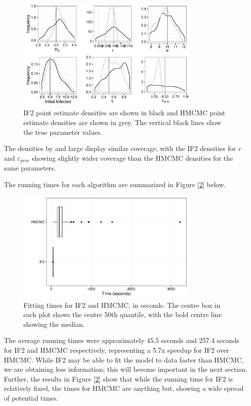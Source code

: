     \begin{figure}
        \centering
        \captionsetup{width=.8\linewidth}
        \includegraphics[width=0.8\textwidth]{./images/combined-multi.pdf}
        \caption{IF2 point estimate densities are shown in black and HMCMC point estimate densities are shown in grey. The vertical black lines show the true parameter values. \label{combinedmulti}}
    \end{figure}

    The densities by and large display similar coverage, with the IF2 densities for $r$ and $\varepsilon_{proc}$ showing slightly wider coverage than the HMCMC densities for the same parameters.

    The running times for each algorithm are summarized in Figure [\ref{timeplot}] below.

	\begin{figure}
        \centering
        \captionsetup{width=.8\linewidth}
        \includegraphics[width=0.8\textwidth]{./images/timeplot.pdf}
        \caption{Fitting times for IF2 and HMCMC, in seconds. The centre box in each plot shows the centre 50th quantile, with the bold centre line showing the median. \label{timeplot}}
    \end{figure}

    The average running times were approximately 45.5 seconds and 257.4 seconds for IF2 and HMCMC respectively, representing a 5.7x speedup for IF2 over HMCMC. While IF2 may be able to fit the model to data faster than HMCMC, we are obtaining less information; this will become important in the next section. Further, the results in Figure [\ref{timeplot}] show that while the running time for IF2 is relatively fixed, the times for HMCMC are anything but, showing a wide spread of potential times.
